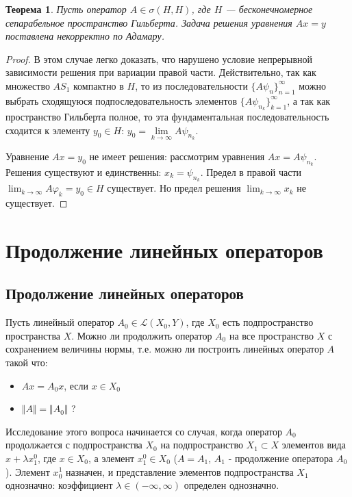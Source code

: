 \documentclass[12pt,a4paper,titlepage,oneside]{book}
\theoremstyle{definition}
\theoremstyle{plain}
\newtheorem*{theorem}{Теорема}
\theoremstyle{break}
\theoremstyle{remark}
\theoremstyle{remark}
\theoremstyle{remark}
\theoremstyle{remark}
\theoremstyle{plain}
\theoremstyle{plain}
\begin{document}
\begin{theorem}
Пусть оператор $A \in \sigma (H,H)$, где $H$ --- бесконечномерное сепарабельное пространство Гильберта. Задача решения уравнения $Ax=y$ поставлена некорректно по Адамару.
\end{theorem}

\begin{proof}
В этом случае легко доказать, что нарушено условие непрерывной зависимости решения при вариации правой части. Действительно, так как множество $AS_1$ компактно в $H$, то из последовательности $\lbrace A \psi_n\rbrace_{n=1}^{\infty}$ можно выбрать сходящуюся подпоследовательность элементов $\lbrace A \psi_{n_k}\rbrace_{k=1}^{\infty}$, а так как пространство Гильберта полное, то эта фундаментальная последовательность сходится к элементу $y_0 \in H$: $y_0=\underset{k \to \infty}{\lim} A \psi_{n_k}$.

Уравнение $Ax = y_0$ не имеет решения: рассмотрим уравнения $Ax = A \psi_{n_k}$. Решения существуют и единственны: $x_k = \psi_{n_k}$. Предел в правой части $\displaystyle\lim_{k \to \infty} A \varphi_k = y_0 \in H$ существует. Но предел решения $\displaystyle\lim_{k \to \infty} x_k$ не существует.
\end{proof}

\chapter{Продолжение линейных операторов}

\section{Продолжение линейных операторов}
Пусть линейный оператор $A_0\in \mathcal{L}(X_0,Y)$, где $X_0$ есть подпространство пространства $X$. Можно ли продолжить оператор $A_0$ на все пространство $X$ с сохранением величины нормы, т.е. можно ли построить линейных оператор $A$ такой что:
\begin{itemize}
 \item $Ax = A_0x$, если $x\in X_0$
 \item $\Vert A \Vert = \Vert A_0 \Vert$ ?
\end{itemize}


Исследование этого вопроса начинается со случая, когда оператор $A_0$ продолжается с подпространства $X_0$ на подпространство $X_1\subset X$ элементов вида $x+\lambda x_1^0$, где $x\in X_0$, а элемент $x_1^0 \in X_0$ ($A = A_1$, $A_1$ - продолжение оператора $A_0$). Элемент $x_0^1$ назначен, и представление элементов подпространства $X_1$ однозначно: коэффициент $\lambda \in (-\infty , \infty)$ определен однозначно. 
\end{document}
